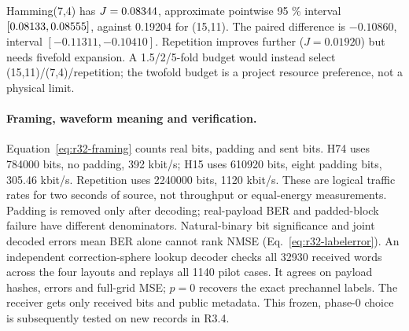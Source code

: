 \begin{table}[htbp]
 \centering\small
 \caption{Defined alternatives and phase-0 selection score. Feasibility uses the declared twofold expansion budget, not the later rate cap.}
 \label{tab:r32-selection}
 
 
 
\end{table}

Hamming(7,4) has $ J=0.08344 $, approximate pointwise 95 \% interval
$[0.08133,0.08555]$, against 0.19204 for (15,11).
The paired difference is $-0.10860 $, interval $[-0.11311,-0.10410]$.
Repetition improves further ($ J=0.01920 $) but needs fivefold expansion.
A 1.5/2/5-fold budget would instead select (15,11)/(7,4)/repetition;
the twofold budget is a project resource preference, not a physical limit.

\paragraph{Framing, waveform meaning and verification.}
Equation~\eqref{eq:r32-framing} counts real bits, padding and sent bits.
H74 uses 784000 bits, no padding, 392 kbit/s; H15 uses 610920 bits, eight
padding bits, 305.46 kbit/s. Repetition uses 2240000 bits, 1120 kbit/s.
These are logical traffic rates for two seconds of source, not throughput
or equal-energy measurements. Padding is removed only after decoding;
real-payload BER and padded-block failure have different denominators.
Natural-binary bit significance and joint decoded errors mean BER alone
cannot rank NMSE (Eq.~\eqref{eq:r32-labelerror}).
An independent correction-sphere lookup decoder checks all 32930 received
words across the four layouts and replays all 1140 pilot cases. It agrees
on payload hashes, errors and full-grid MSE; $ p=0 $ recovers the exact
prechannel labels. The receiver gets only received bits and public metadata.
This frozen, phase-0 choice is subsequently tested on new records in R3.4.
